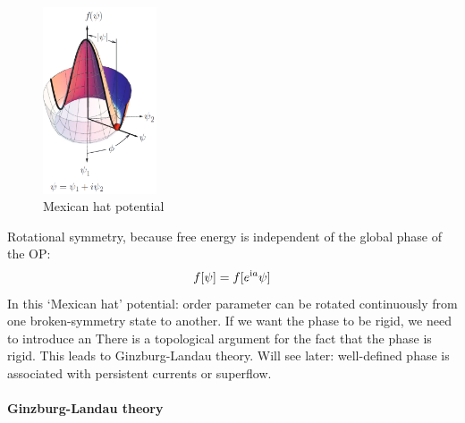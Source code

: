 \documentclass[../notes.tex]{subfiles}
\begin{document}
\begin{figure}[t]
	\centering
	\includegraphics[width=0.3\textwidth]{images/landau free energy mexican hat}
	\caption{Mexican hat potential}
	\label{fig:Landau free energy mexican hat potential}
\end{figure}


Rotational symmetry, because free energy is independent of the global phase of the OP:
\begin{equation}
	f [\psi] = f [e^{\mathrm{i} a } \psi]
\end{equation}
In this `Mexican hat' potential: order parameter can be rotated continuously from one broken-symmetry state to another.
If we want the phase to be rigid, we need to introduce an
There is a topological argument for the fact that the phase is rigid.
This leads to Ginzburg-Landau theory.
Will see later: well-defined phase is associated with persistent currents or superflow.

\paragraph{Ginzburg-Landau theory} 
\end{document}
